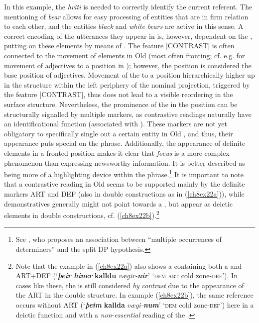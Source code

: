 \documentclass[output=paper,colorlinks,citecolor=brown]{langscibook}
\begin{document}
In this example, the  \emph{hviti} is needed to correctly
identify the current referent. The mentioning of \emph{bear} allows for easy
processing of entities that are in firm relation to each other, and the
entities  \emph{black} and \emph{white bears} are active in this
sense. A correct encoding of the utterances they appear in is, however,
dependent on the , putting  on these elements by
means of . The feature {[}CONTRAST{]} is often connected to the
movement of elements in Old  
(most often fronting; cf. e.g. \citealp{Demonte2008} for
movement of adjectives to a  position in ); however, the  position is considered the base
position of adjectives. Movement of the  to a position
hierarchically higher up in the structure within the left periphery of
the nominal projection, triggered by the feature {[}CONTRAST{]}, thus
does not lead to a visible reordering in the surface structure.
Nevertheless, the prominence of the  in the  position
can be structurally signalled by multiple  markers, as
contrastive readings naturally have an identificational function
(associated with ). These markers are not yet obligatory to
specifically single out a certain entity in Old , and thus,
their appearance puts special  on the phrase. Additionally, the
appearance of definite elements in a fronted position makes it clear
that \emph{focus} is a more complex phenomenon than  expressing
newsworthy information. It is better described as being more of a
highlighting device within the phrase.\footnote{See \citet[25]{Giusti2005},
  who proposes an association between ``multiple occurrences of determiners''
  and the split DP hypothesis.} It is important to note that
a contrastive reading in Old  seems to be supported mainly by
the definite markers ART and DEF (also in double  constructions as in (\ref{ch8ex22a})), while demonstratives generally might
not point towards a , but appear as deictic elements in double
 constructions, cf. (\ref{ch8ex22b}).\footnote{Note that the example in
  (\ref{ch8ex22a}) also shows a  containing both a  and ART+DEF
  (`\textit{\textbf{þeir hiner}} \textbf{kalldu} \textit{vægir-\textbf{nir}}' `\textsc{dem} \textsc{art} cold zone-\textsc{def}'). In cases like these,
  the  is still considered \emph{ by contrast} due to
  the appearance of the  ART in the double 
  structure. In example (\ref{ch8ex22b}), the same reference occurs without ART (`\textit{\textbf{þeim}} \textbf{kallda} \textit{vægi-\textbf{num}}' `\textsc{dem} cold zone-\textsc{def}')
  here in a deictic function and with a \emph{non}-\emph{essential}
  reading of the .}
\end{document}
